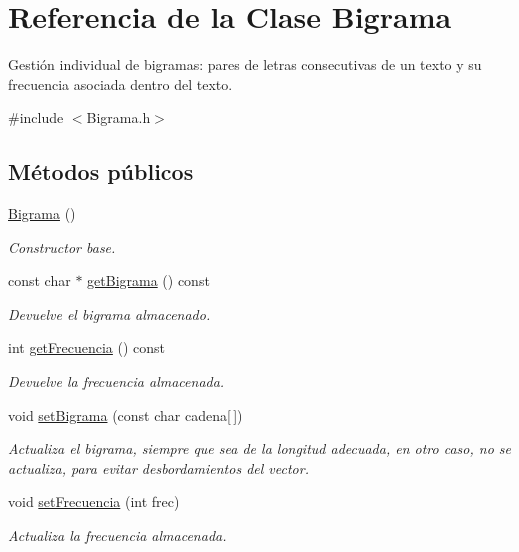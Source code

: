 \hypertarget{classBigrama}{}\section{Referencia de la Clase Bigrama}
\label{classBigrama}


Gestión individual de bigramas\+: pares de letras consecutivas de un texto y su frecuencia asociada dentro del texto.  




{\ttfamily \#include $<$Bigrama.\+h$>$}

\subsection*{Métodos públicos}
\begin{DoxyCompactItemize}
\item 
\hyperlink{classBigrama_ab23e397dac61913482c119af30fe37a2}{Bigrama} ()\hypertarget{classBigrama_ab23e397dac61913482c119af30fe37a2}{}\label{classBigrama_ab23e397dac61913482c119af30fe37a2}

\begin{DoxyCompactList}\small\item\em Constructor base. \end{DoxyCompactList}\item 
const char $\ast$ \hyperlink{classBigrama_a66ca46066bbcc28d0e428f779f7da941}{get\+Bigrama} () const 
\begin{DoxyCompactList}\small\item\em Devuelve el bigrama almacenado. \end{DoxyCompactList}\item 
int \hyperlink{classBigrama_a61bb256efe3cf173e91cbba124e27f48}{get\+Frecuencia} () const 
\begin{DoxyCompactList}\small\item\em Devuelve la frecuencia almacenada. \end{DoxyCompactList}\item 
void \hyperlink{classBigrama_ad9f512b7f00068f100f2fdfb5de32746}{set\+Bigrama} (const char cadena\mbox{[}$\,$\mbox{]})
\begin{DoxyCompactList}\small\item\em Actualiza el bigrama, siempre que sea de la longitud adecuada, en otro caso, no se actualiza, para evitar desbordamientos del vector. \end{DoxyCompactList}\item 
void \hyperlink{classBigrama_a63dd808514f1eaf233f49cbbe3c2af82}{set\+Frecuencia} (int frec)
\begin{DoxyCompactList}\small\item\em Actualiza la frecuencia almacenada. \end{DoxyCompactList}\end{DoxyCompactItemize}


